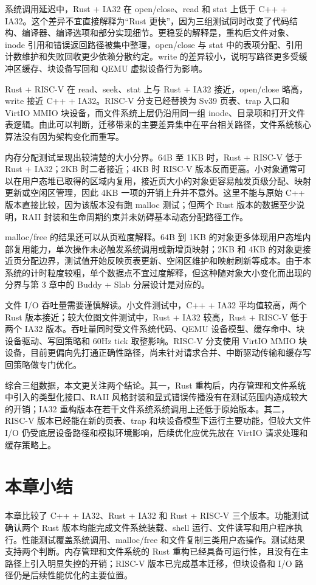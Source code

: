 系统调用延迟中，Rust + IA32 在 open/close、read 和 stat 上低于 C++ + IA32。这个差异不宜直接解释为“Rust 更快”，因为三组测试同时改变了代码结构、编译器、编译选项和部分实现细节。更稳妥的解释是，重构后文件对象、inode 引用和错误返回路径被集中整理，open/close 与 stat 中的表项分配、引用计数维护和失败回收更少依赖分散约定。write 的差异较小，说明写路径更多受缓冲区缓存、块设备写回和 QEMU 虚拟设备行为影响。

Rust + RISC-V 在 read、seek、stat 上与 Rust + IA32 接近，open/close 略高，write 接近 C++ + IA32。RISC-V 分支已经替换为 Sv39 页表、trap 入口和 VirtIO MMIO 块设备，而文件系统上层仍沿用同一组 inode、目录项和打开文件表逻辑。由此可以判断，迁移带来的主要差异集中在平台相关路径，文件系统核心算法没有因为架构变化而重写。

内存分配测试呈现出较清楚的大小分界。64B 至 1KB 时，Rust + RISC-V 低于 Rust + IA32；2KB 时二者接近；4KB 时 RISC-V 版本反而更高。小对象通常可以在用户态堆已取得的区域内复用，接近页大小的对象更容易触发页级分配、映射更新或空闲区管理，因此 4KB 一项的开销上升并不意外。这里不能与原始 C++ 版本直接比较，因为该版本没有跑 malloc 测试；但两个 Rust 版本的数据至少说明，RAII 封装和生命周期约束并未妨碍基本动态分配路径工作。

malloc/free 的结果还可以从页粒度解释。64B 到 1KB 的对象更多体现用户态堆内部复用能力，单次操作未必触发系统调用或新增页映射；2KB 和 4KB 的对象更接近页分配边界，测试值开始反映页表更新、空闲区维护和映射刷新等成本。由于本系统的计时粒度较粗，单个数据点不宜过度解释，但这种随对象大小变化而出现的分界与第 3 章中的 Buddy + Slab 分层设计是对应的。

文件 I/O 吞吐量需要谨慎解读。小文件测试中，C++ + IA32 平均值较高，两个 Rust 版本接近；较大位图文件测试中，Rust + IA32 较高，Rust + RISC-V 低于两个 IA32 版本。吞吐量同时受文件系统代码、QEMU 设备模型、缓存命中、块设备驱动、写回策略和 60Hz tick 取整影响。RISC-V 分支使用 VirtIO MMIO 块设备，目前更偏向先打通正确性路径，尚未针对请求合并、中断驱动传输和缓存写回策略做专门优化。

综合三组数据，本文更关注两个结论。其一，Rust 重构后，内存管理和文件系统中引入的类型化接口、RAII 风格封装和显式错误传播没有在测试范围内造成较大的开销；IA32 重构版本在若干文件系统系统调用上还低于原始版本。其二，RISC-V 版本已经能在新的页表、trap 和块设备模型下运行主要功能，但较大文件 I/O 仍受底层设备路径和模拟环境影响，后续优化应优先放在 VirtIO 请求处理和缓存策略上。

\section{本章小结}

本章比较了 C++ + IA32、Rust + IA32 和 Rust + RISC-V 三个版本。功能测试确认两个 Rust 版本均能完成文件系统装载、shell 运行、文件读写和用户程序执行。性能测试覆盖系统调用、malloc/free 和文件复制三类用户态操作。测试结果支持两个判断。内存管理和文件系统的 Rust 重构已经具备可运行性，且没有在主路径上引入明显失控的开销；RISC-V 版本已完成基本迁移，但块设备和 I/O 路径仍是后续性能优化的主要位置。
